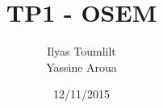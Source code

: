 \documentclass[a4paper, 11pt]{article}
\begin{document}
 
\title{TP1 - OSEM}
\author{Ilyas Toumlilt\\Yassine Aroua}
\date{12/11/2015}
 
\maketitle










\end{document}
